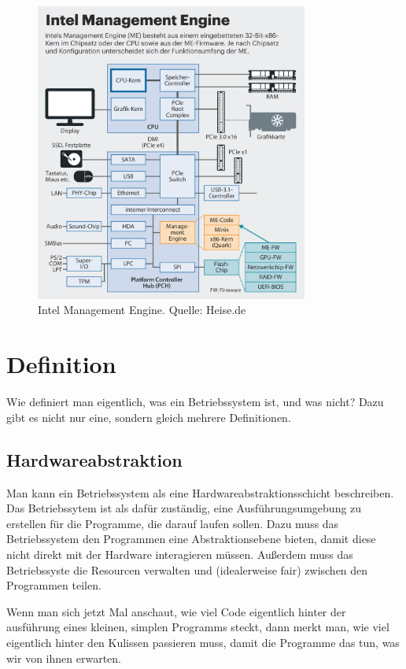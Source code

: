 \documentclass[ngerman,abstract=true]{scrartcl}
\begin{document}
\begin{figure}\centering
\includegraphics[width=0.8\textwidth]{media/intelme}
\caption{Intel Management Engine. Quelle: Heise.de}\label{fig:intelme}
\end{figure}



\section{Definition}

Wie definiert man eigentlich, was ein Betriebssystem ist, und was nicht? Dazu gibt es nicht nur eine, sondern gleich mehrere Definitionen. 

\subsection{Hardwareabstraktion}

Man kann ein Betriebssystem als eine Hardwareabstraktionsschicht beschreiben. Das Betriebssytem ist als dafür zuständig, eine Ausführungsumgebung zu erstellen für die Programme, die darauf laufen sollen. Dazu muss das Betriebssystem den Programmen eine Abstraktionsebene bieten, damit diese nicht direkt mit der Hardware interagieren müssen. Außerdem muss das Betriebssyste die Resourcen verwalten und (idealerweise fair) zwischen den Programmen teilen.



Wenn man sich jetzt Mal anschaut, wie viel Code eigentlich hinter der ausführung eines kleinen, simplen Programms steckt, dann merkt man, wie viel eigentlich hinter den Kulissen passieren muss, damit die Programme das tun, was wir von ihnen erwarten.
\end{document}
